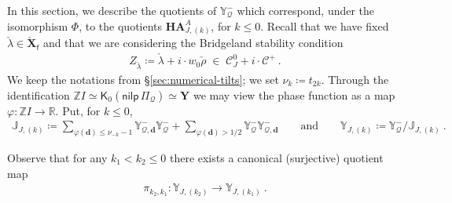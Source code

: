 \documentclass[reqno,a4paper]{amsart}
\newcommand{\calC}{\mathcal{C}}
\newcommand{\J}{\mathbb{J}}
\newcommand{\R}{\mathbb{R}}
\newcommand{\Y}{\mathbb{Y}}
\newcommand{\Z}{\mathbb{Z}}
\newcommand{\sfK}{\mathsf{K}}
\newcommand{\sff}{\mathsf{f}}
\newcommand{\bfY}{\mathbf{Y}}
\newcommand{\bfX}{\mathbf{X}}
\newcommand{\bfd}{\mathbf{d}}
\newcommand{\nilpPi}{\mathsf{nilp}\, \Pi}
\newcommand{\qv}{\mathcal{Q}}
\newcommand{\Llambda}{{\check{\lambda}}}
\newcommand{\Lrho}{\check{\rho}}
\newcommand{\rootlattice}{\bfY}
\newcommand{\weightlattice}{\bfX}
\newcommand{\coweightlattice}{\check{\weightlattice}}
\newcommand{\coweightlatticefin}{\coweightlattice_\sff}
\newcommand{\coha}{\mathbf{HA}}
\theoremstyle{basic-theorem}
\numberwithin{equation}{section}
\begin{document}
In this section, we describe the quotients of $\Y^-_\qv$ which correspond, under the isomorphism $\Phi$, to the quotients $\coha_{J, (k)}^A$, for $k \leq 0$. Recall that we have fixed $\Llambda \in \coweightlatticefin$ and that we are considering the Bridgeland stability condition
\begin{align}
	 Z_\Llambda \coloneqq \Llambda + i\cdot w_0\Lrho \; \in\; \calC_J^0+i\cdot \calC^+\ .
\end{align}
We keep the notations from \S\ref{sec:numerical-tilts}; we set $\nu_{k}\coloneqq t_{2k}$. Through the identification $\Z I \simeq \sfK_0(\nilpPi_\qv)\simeq \rootlattice$ we may view the phase function as a map $\varphi\colon \Z I \to \R$. Put, for $k \leq 0$,
\begin{align}
	\J_{J,(k)}\coloneqq \sum_{ \varphi(\bfd)\leq\nu_{-k}-1} \Y^-_{\qv,\bfd} \Y^-_\qv + \sum_{ \varphi(\bfd)>1/2} \Y^-_{\qv} \Y^-_{\qv,\bfd} \qquad \text{and} \qquad \Y_{J,(k)}\coloneqq \Y^-_\qv/\J_{J,(k)}\ .
\end{align}

Observe that for any $k_1<k_2\leq 0$ there exists a canonical (surjective) quotient map
\begin{align}
	\pi_{k_2,k_1}\colon \Y_{J,(k_2)} \longrightarrow \Y_{J,(k_1)}\ . 
\end{align}
\end{document}
